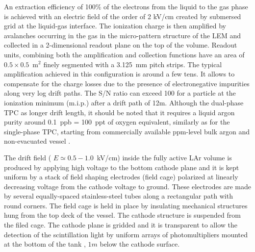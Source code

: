 An extraction efficiency of  100\% of the electrons from the liquid to the gas phase is achieved with an electric field of the order of 2 kV/cm created by submersed grid at the liquid-gas interface. The ionization charge is then amplified by avalanches occurring in the gas in the micro-pattern structure of the LEM and collected in a 2-dimensional readout plane on the top of the volume. Readout units, combining both the amplification and collection functions have an area of $0.5\times 0.5$~m$^2$ finely segmented with a 3.125~mm pitch strips. The typical amplification achieved in this configuration is around a few tens. It allows to compensate for the charge losses due to the presence of electronegative impurities along very log drift paths. The S/N ratio can exceed 100 for a particle at the ionization minimum (m.i.p.) after a drift path of 12m. Although the dual-phase TPC as longer drift length, it should be noted that it requires a liquid argon purity around 0.1~ppb = 100~ppt of oxygen equivalent, similarly as for the single-phase TPC,
starting from commercially available ppm-level bulk argon and non-evacuated vessel \cite{WA105_TDR}.

The drift field ( $E{\simeq} 0.5-1.0$~kV/cm) inside the fully active LAr volume  is  produced by applying high voltage  to the bottom cathode plane and it is kept uniform by a stack of field shaping electrodes (field cage) polarized at linearly decreasing voltage from the cathode voltage to ground. These electrodes are  made by several equally-spaced stainless-steel tubes along a rectangular path with round corners. The field cage is held in place by insulating mechanical structures hung from the top deck of the vessel.  The cathode structure is suspended from the filed cage. The cathode plane is gridded and it is transparent to allow the detection of the scintillation light by uniform arrays of photomultipliers mounted at the bottom of the tank , $1m$  below the cathode surface. 

